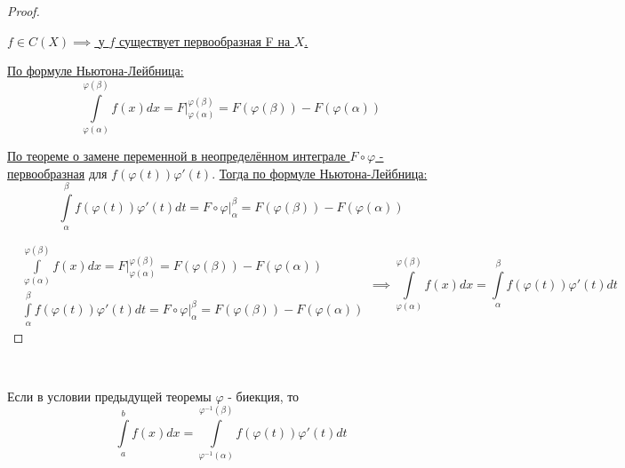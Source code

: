 \documentclass[../main.tex]{subfiles}
\begin{document}
\begin{proof}
    
    ~

    \hyperlink{thm:primitive_existance}{\( f \in C\left( X\right) \implies \) у \( f\) существует первообразная F на \( X\).}

    \hyperlink{thm:main_thm}{По формуле Ньютона-Лейбница:}
    \[ \displaystyle\int\limits_{ \varphi \left( \alpha \right)}^{ \varphi \left( \beta \right)} f\left( x\right)dx=F|_{ \varphi \left( \alpha \right)}^{ \varphi \left( \beta \right)}=F\left( \varphi \left( \beta \right)\right)-F\left( \varphi \left( \alpha \right)\right)\]

    \hyperlink{thm:undef_int_change}{По теореме о замене переменной в неопределённом интеграле \( F \circ \varphi \) - первообразная} для \( f\left( \varphi \left( t\right)\right) \varphi '\left( t\right)\). \hyperlink{thm:main_thm}{Тогда по формуле Ньютона-Лейбница:}
    \[ \displaystyle\int\limits_{ \alpha }^{ \beta } f\left( \varphi \left( t\right)\right) \varphi '\left( t\right)dt=F \circ \varphi |_{ \alpha }^{ \beta }=F\left( \varphi \left( \beta \right)\right)-F\left( \varphi \left( \alpha \right)\right)\]

    \begin{equation*}
        \begin{aligned}
            &\displaystyle\int\limits_{ \varphi \left( \alpha \right)}^{ \varphi \left( \beta \right)} f\left( x\right)dx=F|_{ \varphi \left( \alpha \right)}^{ \varphi \left( \beta \right)}=F\left( \varphi \left( \beta \right)\right)-F\left( \varphi \left( \alpha \right)\right)\\
            &\displaystyle\int\limits_{ \alpha }^{ \beta } f\left( \varphi \left( t\right)\right) \varphi '\left( t\right)dt=F \circ \varphi |_{ \alpha }^{ \beta }=F\left( \varphi \left( \beta \right)\right)-F\left( \varphi \left( \alpha \right)\right)
        \end{aligned}
        \implies 
        \displaystyle\int\limits_{ \varphi \left( \alpha \right)}^{ \varphi \left( \beta \right)} f\left( x\right)dx =\displaystyle\int\limits_{ \alpha }^{ \beta } f\left( \varphi \left( t\right)\right) \varphi '\left( t\right)dt
    \end{equation*}
\end{proof}

\begin{crl}
    
    ~

    Если в условии предыдущей теоремы \( \varphi \) - биекция, то 
    \[ \displaystyle\int\limits_{ a}^{ b} f\left( x\right)dx= \displaystyle\int\limits_{ \varphi ^{-1}\left( \alpha \right)}^{ \varphi ^{-1}\left( \beta \right)} f\left( \varphi \left( t\right)\right) \varphi '\left( t\right)dt\]
\end{crl}
\end{document}
